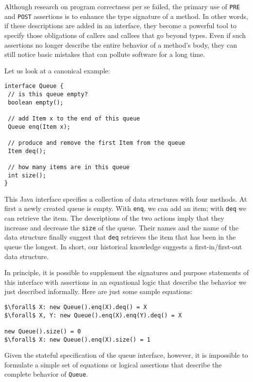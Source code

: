 \documentclass[11pt]{article}
\begin{document}
Although research on program correctness per se failed, the primary use
  of {\tt PRE} and {\tt POST} assertions is to enhance the
  type signature of a method. In other words, if these descriptions are
  added in an interface, they become a powerful tool to specify those
  obligations of callers and callees that go beyond types. Even if such
  assertions no longer describe the entire behavior of a method's body,
  they can still notice basic mistakes that can pollute software for a long
  time. 


Let us look at a canonical example:
\begin{verbatim}
interface Queue {
 // is this queue empty? 
 boolean empty();

 // add Item x to the end of this queue
 Queue enq(Item x); 

 // produce and remove the first Item from the queue
 Item deq(); 

 // how many items are in this queue 
 int size();
}
\end{verbatim}

This Java interface specifies a collection of data structures with four
methods. At first a newly created queue is empty. With {\tt enq}, we can
add an item; with {\tt deq} we can retrieve the item. The descriptions of
the two actions imply that they increase and decrease the {\tt size} of
the queue. Their names and the name of the data structure finally suggest that
{\tt deq} retrieves the item that has been in the queue the longest. In
short, our historical knowledge suggests a first-in/first-out data
structure.

In principle, it is possible to supplement the signatures and purpose
statements of this interface with assertions in an equational logic that
describe the behavior we just described informally. Here are just some sample
equations: 

\begin{verbatim}
$\forall$ X: new Queue().enq(X).deq() = X 
$\forall$ X, Y: new Queue().enq(X).enq(Y).deq() = X  

new Queue().size() = 0 
$\forall$ X: new Queue().enq(X).size() = 1
\end{verbatim}

Given the stateful specification of the queue interface, however, it is
impossible to formulate a simple set of equations or logical assertions that
describe the complete behavior of {\tt Queue}.
\end{document}
